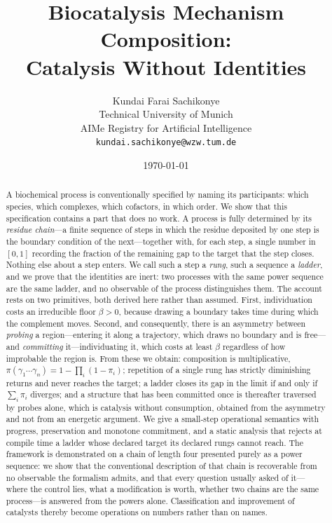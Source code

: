 \documentclass[11pt,twocolumn,a4paper]{article}
\title{\textbf{Biocatalysis Mechanism Composition:\\
Catalysis Without Identities}}
\author{Kundai Farai Sachikonye\\
\small Technical University of Munich\\
\small AIMe Registry for Artificial Intelligence\\
\small \texttt{kundai.sachikonye@wzw.tum.de}}
\date{\today}
\theoremstyle{plain}
\theoremstyle{definition}
\theoremstyle{remark}
\newcommand{\flo}{\beta}
\newcommand{\pow}{\pi}
\newcommand{\Rung}{\gamma}
\begin{document}
\maketitle

\begin{abstract}
\noindent
A biochemical process is conventionally specified by naming its participants:
which species, which complexes, which cofactors, in which order. We show that
this specification contains a part that does no work. A process is fully
determined by its \emph{residue chain}---a finite sequence of steps in which the
residue deposited by one step is the boundary condition of the next---together
with, for each step, a single number in $[0,1]$ recording the fraction of the
remaining gap to the target that the step closes. Nothing else about a step
enters. We call such a step a \emph{rung}, such a sequence a \emph{ladder}, and
we prove that the identities are inert: two processes with the same power
sequence are the same ladder, and no observable of the process distinguishes
them. The account rests on two primitives, both derived here rather than
assumed. First, individuation costs an irreducible floor $\flo > 0$, because
drawing a boundary takes time during which the complement moves. Second, and
consequently, there is an asymmetry between \emph{probing} a region---entering
it along a trajectory, which draws no boundary and is free---and
\emph{committing} it---individuating it, which costs at least $\flo$ regardless
of how improbable the region is. From these we obtain: composition is
multiplicative, $\pow(\Rung_1\cdots\Rung_n) = 1 - \prod_i(1-\pow_i)$; repetition
of a single rung has strictly diminishing returns and never reaches the target;
a ladder closes its gap in the limit if and only if $\sum_i \pow_i$ diverges;
and a structure that has been committed once is thereafter traversed by probes
alone, which is catalysis without consumption, obtained from the asymmetry and
not from an energetic argument. We give a small-step operational semantics with
progress, preservation and monotone commitment, and a static analysis that
rejects at compile time a ladder whose declared target its declared rungs cannot
reach. The framework is demonstrated on a chain of length four presented purely
as a power sequence: we show that the conventional description of that chain is
recoverable from no observable the formalism admits, and that every question
usually asked of it---where the control lies, what a modification is worth,
whether two chains are the same process---is answered from the powers alone.
Classification and improvement of catalysts thereby become operations on
numbers rather than on names.
\end{abstract}
\end{document}
